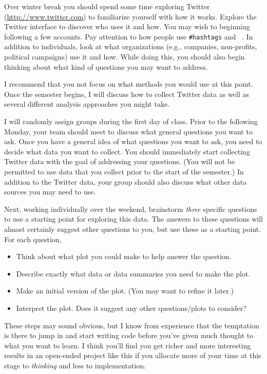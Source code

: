 \documentclass[11pt, oneside]{article}   	%
\begin{document}
Over winter break you should spend some time exploring Twitter
(\url{http://www.twitter.com}) to familiarize yourself with how it works.
Explore the Twitter interface to discover who uses it and how. You may wish to
beginning following a few accounts.  Pay attention to how people use
\texttt{\#hashtags} and \texttt{\ \@mentions}.  In addition to individuals, look at
what organizations (e.g., companies, non-profits, political campaigns) use it
and how.  While doing this, you should also begin thinking about what kind of
questions you may want to address.

I recommend that you not focus on what methods you would use at this point.
Once the semester begins, I will discuss how to collect Twitter data as well as
several different analysis approaches you might take.

I will randomly assign groups during the first day of class. Prior to the
following Monday, your team should meet to discuss what general questions you
want to ask.  Once you have a general idea of what questions you want to ask,
you need to decide what data you want to collect.  You should immediately start
collecting Twitter data with the goal of addressing your questions.  (You will
not be permitted to use data that you collect prior to the start of the
semester.)  In addition to the Twitter data, your group should also discuss
what other data sources you may need to use.

Next, working individually over the weekend, brainstorm {\em three} specific
questions to use a starting point for exploring this data. The answers to these
questions will almost certainly suggest other questions to you, but use these
as a starting point.  For each question,
\begin{itemize}
\item Think about what plot you could make to help answer the question.
\item Describe exactly what data or data summaries you need to make the plot.
\item Make an initial version of the plot. (You may want to refine it later.)
\item Interpret the plot. Does it suggest any other questions/plots to consider?
\end{itemize}
These steps may sound obvious, but I know from experience that the temptation
is there to jump in and start writing code before you've given much thought to
what you want to learn. I think you'll find you get richer and more interesting
results in an open-ended project like this if you allocate more of your time at
this stage to {\em thinking} and less to implementation.
\end{document}
